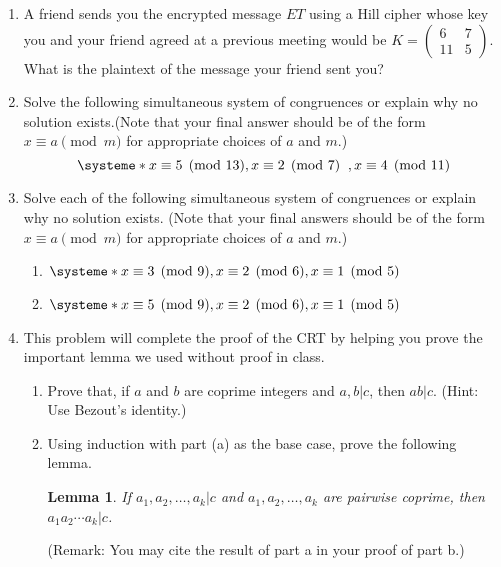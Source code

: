 \documentclass[12pt]{article}
\newtheorem*{lemma}{Lemma}
\begin{document}
\begin{enumerate}
 \item  A friend sends you the encrypted message $ET$ using a Hill cipher whose key you and your friend agreed at a previous meeting would be $K = \begin{pmatrix}
6 & 7\\ 
11 & 5
\end{pmatrix}$.  What is the plaintext of the message your friend sent you?\\

\item Solve the following simultaneous system of congruences or explain why no solution exists.(Note that your final answer should be of the form $x\equiv a\pmod{m}$ for appropriate choices of $a$ and $m$.)
$$\systeme*{x\equiv 5\pmod{13}, x\equiv 2\pmod{7}\;\;, x\equiv 4 \pmod{11}}$$

\item Solve each of the following simultaneous system of congruences or explain why no solution exists. (Note that your final answers should be of the form $x\equiv a\pmod{m}$ for appropriate choices of $a$ and $m$.)
\begin{enumerate}
\item $\systeme*{x\equiv 3\pmod{9}, x\equiv 2\pmod 6, x\equiv 1\pmod{5}}$
\item $\systeme*{x\equiv 5\pmod{9}, x\equiv 2\pmod 6, x\equiv 1\pmod{5}}$
\end{enumerate}
\item This problem will complete the proof of the CRT by helping you prove the important lemma we used without proof in class.
\begin{enumerate}
\item Prove that, if $a$ and $b$ are coprime integers and $a,b|c$, then $ab|c$. (Hint: Use Bezout's identity.)
\item Using induction with part (a) as the base case, prove the following lemma.
\begin{lemma} If $a_1,a_2,\ldots, a_k|c$ and $a_1,a_2,\ldots, a_k$ are pairwise coprime, then $a_1a_2\cdots a_k|c$. 
\end{lemma}
(Remark: You may cite the result of part a in your proof of part b.)
\end{enumerate}

\end{enumerate}
\end{document}
